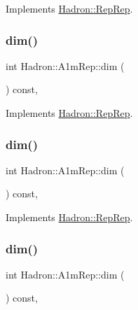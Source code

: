 Implements \mbox{\hyperlink{structHadron_1_1RepRep_a92c8802e5ed7afd7da43ccfd5b7cd92b}{Hadron\+::\+Rep\+Rep}}.

\mbox{\label{structHadron_1_1A1mRep_a475332da370a6a8c6ad3d24cf3f6d38a}} 
\subsubsection{\texorpdfstring{dim()}{dim()}\hspace{0.1cm}{\footnotesize\ttfamily [3/5]}}
{\footnotesize\ttfamily int Hadron\+::\+A1m\+Rep\+::dim (\begin{DoxyParamCaption}{ }\end{DoxyParamCaption}) const\hspace{0.3cm}{\ttfamily [inline]}, {\ttfamily [virtual]}}



Implements \mbox{\hyperlink{structHadron_1_1RepRep_a92c8802e5ed7afd7da43ccfd5b7cd92b}{Hadron\+::\+Rep\+Rep}}.

\mbox{\label{structHadron_1_1A1mRep_a475332da370a6a8c6ad3d24cf3f6d38a}} 
\subsubsection{\texorpdfstring{dim()}{dim()}\hspace{0.1cm}{\footnotesize\ttfamily [4/5]}}
{\footnotesize\ttfamily int Hadron\+::\+A1m\+Rep\+::dim (\begin{DoxyParamCaption}{ }\end{DoxyParamCaption}) const\hspace{0.3cm}{\ttfamily [inline]}, {\ttfamily [virtual]}}



Implements \mbox{\hyperlink{structHadron_1_1RepRep_a92c8802e5ed7afd7da43ccfd5b7cd92b}{Hadron\+::\+Rep\+Rep}}.

\mbox{\label{structHadron_1_1A1mRep_a475332da370a6a8c6ad3d24cf3f6d38a}} 
\subsubsection{\texorpdfstring{dim()}{dim()}\hspace{0.1cm}{\footnotesize\ttfamily [5/5]}}
{\footnotesize\ttfamily int Hadron\+::\+A1m\+Rep\+::dim (\begin{DoxyParamCaption}{ }\end{DoxyParamCaption}) const\hspace{0.3cm}{\ttfamily [inline]}, {\ttfamily [virtual]}}



